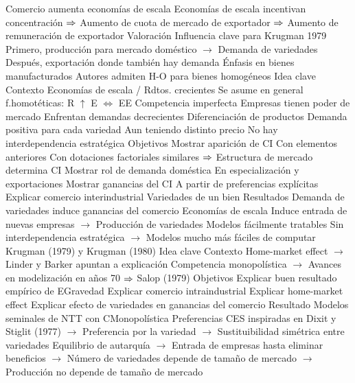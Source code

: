 \documentclass{nuevotema}
\begin{document}
\begin{esquemal}
				\4[] Comercio aumenta economías de escala
				\4[] Economías de escala incentivan concentración
				\4[] $\Rightarrow$ Aumento de cuota de mercado de exportador
				\4[] $\Rightarrow$ Aumento de remuneración de exportador
			\3 Valoración
				\4 Influencia clave para Krugman 1979
				\4[] Primero, producción para mercado doméstico
				\4[] $\to$ Demanda de variedades
				\4[] Después, exportación donde también hay demanda
				\4 Énfasis en bienes manufacturados
				\4[] Autores admiten H-O para bienes homogéneos
	\1 
		\2 Idea clave
			\3 Contexto
				\4 Economías de escala / Rdtos. crecientes
				\4[] Se asume en general f.homotéticas: R $\uparrow$ E $\iff$ EE
				\4 Competencia imperfecta
				\4[] Empresas tienen poder de mercado
				\4[] Enfrentan demandas decrecientes
				\4 Diferenciación de productos
				\4[] Demanda positiva para cada variedad
				\4[] Aun teniendo distinto precio
				\4[] No hay interdependencia estratégica
			\3 Objetivos
				\4 Mostrar aparición de CI
				\4[] Con elementos anteriores
				\4[] Con dotaciones factoriales similares
				\4[] $\Rightarrow$ Estructura de mercado determina CI
				\4 Mostrar rol de demanda doméstica
				\4[] En especialización y exportaciones
				\4 Mostrar ganancias del CI
				\4[] A partir de preferencias explícitas
				\4 Explicar comercio interindustrial
				\4[] Variedades de un bien
			\3 Resultados
				\4 Demanda de variedades induce ganancias del comercio
				\4 Economías de escala
				\4[] Induce entrada de nuevas empresas
				\4[] $\to$ Producción de variedades
				\4 Modelos fácilmente tratables
				\4[] Sin interdependencia estratégica
				\4[] $\to$ Modelos mucho más fáciles de computar
		\2 Krugman (1979) y Krugman (1980)
			\3 Idea clave
				\4 Contexto
				\4[] Home-market effect
				\4[] $\to$ Linder y Barker apuntan a explicación
				\4[] Competencia monopolística
				\4[] $\to$ Avances en modelización en años 70
				\4[] $\Rightarrow$ Salop (1979)
				\4 Objetivos
				\4[] Explicar buen resultado empírico de EGravedad
				\4[] Explicar comercio intraindustrial
				\4[] Explicar home-market effect
				\4[] Explicar efecto de variedades en ganancias del comercio
				\4 Resultado
				\4[] Modelos seminales de NTT con CMonopolística
				\4[] Preferencias CES inspiradas en Dixit y Stiglit (1977)
				\4[] $\to$ Preferencia por la variedad
				\4[] $\to$  Sustituibilidad simétrica entre variedades
				\4[] Equilibrio de autarquía
				\4[] $\to$ Entrada de empresas hasta eliminar beneficios
				\4[] $\to$ Número de variedades depende de tamaño de mercado
				\4[] $\to$ Producción no depende de tamaño de mercado

\end{esquemal}
\end{document}
